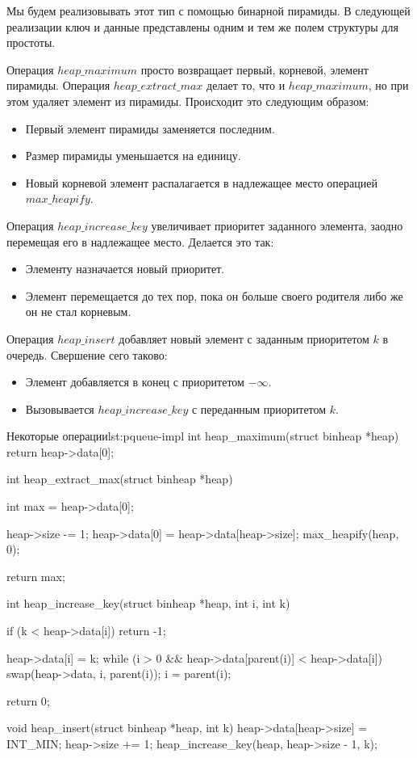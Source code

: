 Мы будем реализовывать этот тип с помощью бинарной пирамиды. В следующей реализации ключ и данные представлены одним и тем же полем структуры для простоты.

Операция $heap\_maximum$ просто возвращает первый, корневой, элемент пирамиды.
Операция $heap\_extract\_max$ делает то, что и $heap\_maximum$, но при этом удаляет элемент из пирамиды. Происходит это следующим образом:

\begin{itemize}
  \item Первый элемент пирамиды заменяется последним.
  \item Размер пирамиды уменьшается на единицу.
  \item Новый корневой элемент распалагается в надлежащее место операцией $max\_heapify$.
\end{itemize}

Операция $heap\_increase\_key$ увеличивает приоритет заданного элемента, заодно перемещая его в надлежащее место. Делается это так:

\begin{itemize}
  \item Элементу назначается новый приоритет.
  \item Элемент перемещается до тех пор, пока он больше своего родителя либо же он не стал корневым.
\end{itemize}

Операция $heap\_insert$ добавляет новый элемент с заданным приоритетом $k$ в очередь. Свершение сего таково:

\begin{itemize}
  \item Элемент добавляется в конец с приоритетом $-\infty$.
  \item Вызовывается $heap\_increase\_key$ с переданным приоритетом $k$.
\end{itemize}

\begin{clst}{Некоторые операции}{lst:pqueue-impl}
int heap_maximum(struct binheap *heap)
{
    return heap->data[0];
}

int heap_extract_max(struct binheap *heap)
{
    int max = heap->data[0];

    heap->size -= 1;
    heap->data[0] = heap->data[heap->size];
    max_heapify(heap, 0);

    return max;
}


int heap_increase_key(struct binheap *heap, int i, int k)
{
    if (k < heap->data[i])
        return -1;

    heap->data[i] = k;
    while (i > 0 && heap->data[parent(i)] < heap->data[i]) {
        swap(heap->data, i, parent(i));
        i = parent(i);
    }

    return 0;
}

void heap_insert(struct binheap *heap, int k)
{
    heap->data[heap->size] = INT_MIN;
    heap->size += 1;
    heap_increase_key(heap, heap->size - 1, k);
}
\end{clst}

